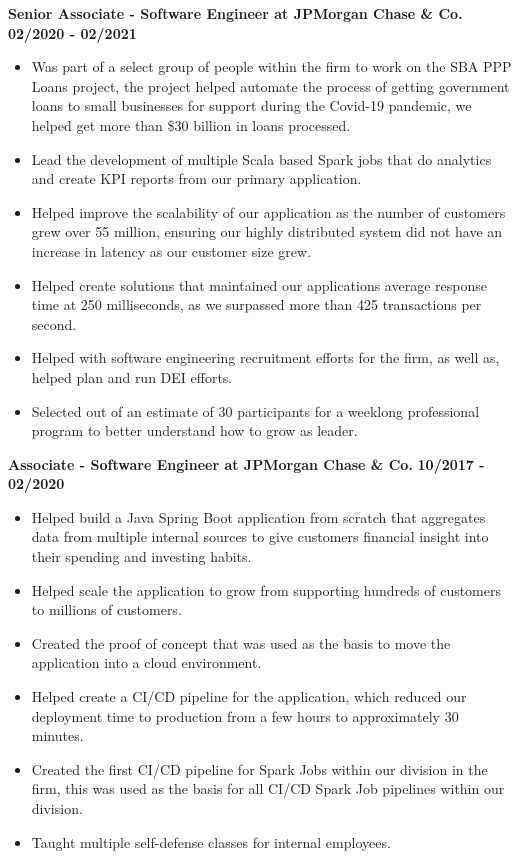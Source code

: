 \documentclass{res}
\begin{document}
\begin{resume}
	\textbf{Senior Associate - Software Engineer at JPMorgan Chase \& Co.}
	\hfill{\bf 02/2020 - 02/2021}
	\begin{itemize}
		\item Was part of a select group of people within the firm to work on the SBA PPP Loans project, the project helped automate the process of getting government loans to small businesses for support during the Covid-19
pandemic, we helped get more than \$30 billion in loans processed.
		\item Lead the development of multiple Scala based Spark jobs that do analytics and create KPI reports from our
primary application.
		\item Helped improve the scalability of our application as the number of customers grew over 55 million, ensuring our highly distributed system did not have an increase in latency as our customer size grew.
		\item Helped create solutions that maintained our applications average response time at 250 milliseconds, as we surpassed more than 425 transactions per second.
		\item Helped with software engineering recruitment efforts for the firm, as well as, helped plan and run DEI efforts.
		\item Selected out of an estimate of 30 participants for a weeklong professional program to better understand how to grow
as leader.
	\end{itemize}

	\textbf{Associate - Software Engineer at JPMorgan Chase \& Co.}
	\hfill{\bf 10/2017 - 02/2020}
	\begin{itemize}
		\item Helped build a Java Spring Boot application from scratch that aggregates data from multiple internal sources
to give customers financial insight into their spending and investing habits.
		\item Helped scale the application to grow from supporting hundreds of customers to millions of customers.
		\item Created the proof of concept that was used as the basis to move the application into a cloud environment.
		\item Helped create a CI/CD pipeline for the application, which reduced our deployment time to production from a few hours to approximately 30 minutes.
		\item Created the first CI/CD pipeline for Spark Jobs within our division in the firm, this was used as the basis for all CI/CD Spark Job pipelines within our division.
		\item Taught multiple self-defense classes for internal employees.
	\end{itemize}


\end{resume}
\end{document}
